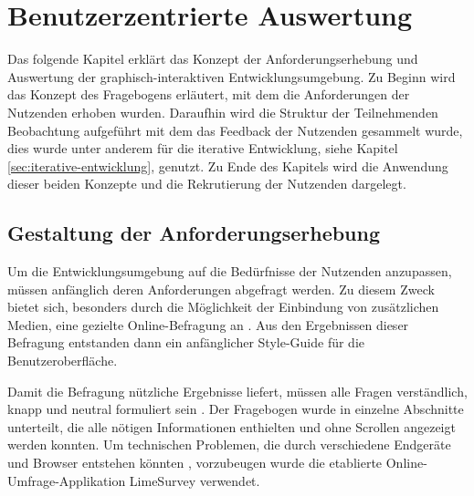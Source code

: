 \chapter{Benutzerzentrierte Auswertung} %
Das folgende Kapitel erklärt das Konzept der Anforderungserhebung und Auswertung der graphisch-interaktiven Entwicklungsumgebung. Zu Beginn wird das Konzept des Fragebogens erläutert, mit dem die Anforderungen der Nutzenden erhoben wurden. Daraufhin wird die Struktur der Teilnehmenden Beobachtung aufgeführt mit dem das Feedback der Nutzenden gesammelt wurde, dies wurde unter anderem für die iterative Entwicklung, siehe Kapitel \ref{sec:iterative-entwicklung}, genutzt. Zu Ende des Kapitels wird die Anwendung dieser beiden Konzepte und die Rekrutierung der Nutzenden dargelegt. %


\section{Gestaltung der Anforderungserhebung} 

Um die Entwicklungsumgebung auf die Bedürfnisse der Nutzenden anzupassen, müssen anfänglich deren Anforderungen abgefragt werden. Zu diesem Zweck bietet sich, besonders durch die Möglichkeit der Einbindung von zusätzlichen Medien, eine gezielte Online-Befragung an \cite{Schnell2018MethodenES}. Aus den Ergebnissen dieser Befragung entstanden dann ein anfänglicher Style-Guide für die Benutzeroberfläche.

Damit die Befragung nützliche Ergebnisse liefert, müssen alle Fragen verständlich, knapp und neutral formuliert sein \cite{Jacobsen2019PraxisbuchUuU}. Der Fragebogen wurde in einzelne Abschnitte unterteilt, die alle nötigen Informationen enthielten und ohne Scrollen angezeigt werden konnten. Um technischen Problemen, die durch verschiedene Endgeräte und Browser entstehen könnten \cite{Schnell2018MethodenES}, vorzubeugen wurde die etablierte Online-Umfrage-Applikation LimeSurvey verwendet. 

